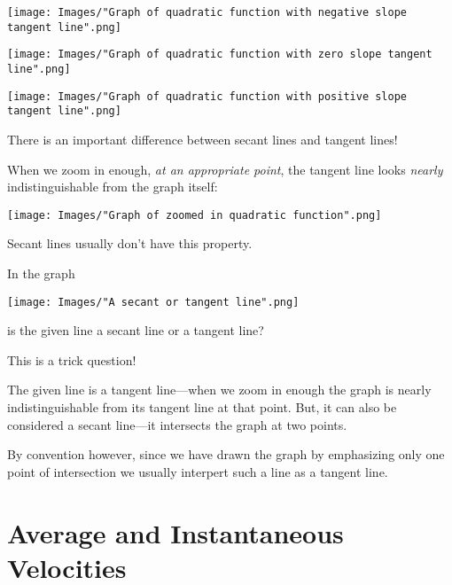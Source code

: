 \documentclass[nooutcomes]{ximera}
\renewenvironment{freeResponse}{
\ifhandout\setbox0\vbox\bgroup\else
\begin{trivlist}\item[\hskip \labelsep\bfseries Solution:\hspace{2ex}]
\fi}
{\ifhandout\egroup\else
\end{trivlist}
\fi}
\begin{document}
\begin{problem}
\begin{itemize}
\begin{freeResponse}
          \begin{image}
            \texttt{[image: Images/"Graph of quadratic function with negative slope tangent line".png]}
          \end{image}
          \begin{image}
            \texttt{[image: Images/"Graph of quadratic function with zero slope tangent line".png]}
          \end{image}
          \begin{image}
            \texttt{[image: Images/"Graph of quadratic function with positive slope tangent line".png]}
          \end{image}

          There is an important difference between secant lines and tangent lines!
          
          When we zoom in enough, \emph{at an appropriate point}, the tangent line looks \emph{nearly} indistinguishable from the graph itself:
          \begin{image}
            \texttt{[image: Images/"Graph of zoomed in quadratic function".png]}
          \end{image}
          Secant lines usually don't have this property.
      \end{freeResponse}

    \item[(c)]
      In the graph
      \begin{center}
        \texttt{[image: Images/"A secant or tangent line".png]}
      \end{center}
      is the given line a secant line or a tangent line?
      \begin{freeResponse}
        This is a trick question!
      
        The given line is a tangent line---when we zoom in enough the graph is nearly indistinguishable from its tangent line at that point.
        But, it can also be considered a secant line---it intersects the graph at two points.

        By convention however, since we have drawn the graph by emphasizing only one point of intersection we usually interpert such a line as a tangent line.
      \end{freeResponse}
  \end{itemize}
\end{problem}

\section{Average and Instantaneous Velocities}
\label{section:average-and-instantaneous-velocities}
\end{document}
